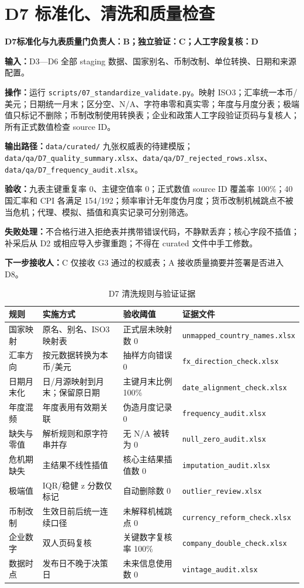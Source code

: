 \documentclass[UTF8,fontset=windows,12pt,openany]{ctexbook}
\newcommand{\File}[1]{{\small\nolinkurl{#1}}}
\newcommand{\StepTitle}[3]{%
  \noindent\colorbox{DeepNavy}{\parbox{0.965\textwidth}{\color{white}\Large\bfseries #1\quad #2\hfill\normalsize #3}}\par\medskip
}
\newcommand{\CardRow}[2]{\noindent\textbf{#1：}#2\par}
\begin{document}
\newpage
\section{D7 标准化、清洗和质量检查}
\StepTitle{D7}{标准化与九表质量门}{负责人：B；独立验证：C；人工字段复核：D}
\CardRow{输入}{D3—D6 全部 staging 数据、国家别名、币制改制、单位转换、日期和来源配置。}
\CardRow{操作}{运行 \File{scripts/07_standardize_validate.py}。映射 ISO3；汇率统一本币/美元；日期统一月末；区分空、N/A、字符串零和真实零；年度与月度分表；极端值只标记不删除；币制改制使用转换表；企业和政策人工字段验证页码与复核人；所有正式数值检查 source ID。}
\CardRow{输出路径}{\File{data/curated/} 九张权威表的待建模版；\File{data/qa/D7_quality_summary.xlsx}、\File{data/qa/D7_rejected_rows.xlsx}、\File{data/qa/D7_frequency_audit.xlsx}。}
\CardRow{验收}{九表主键重复率 0、主键空值率 0；正式数值 source ID 覆盖率 100\%；40 国汇率和 CPI 各满足 154/192；频率审计无年度伪月度；货币改制机械跳点不被当危机；代理、模拟、插值和真实记录可分别筛选。}
\CardRow{失败处理}{不合格行进入拒绝表并携带错误代码，不静默丢弃；核心字段不插值；补采后从 D2 或相应导入步骤重跑；不得在 curated 文件中手工修数。}
\CardRow{下一步接收人}{C 仅接收 G3 通过的权威表；A 接收质量摘要并签署是否进入 D8。}

\begin{longtable}{p{3.3cm}p{3.2cm}p{3.0cm}p{3.8cm}}
\caption{D7 清洗规则与验证证据}\label{tab:clean-rules}\\
\toprule
\textbf{规则} & \textbf{实施方式} & \textbf{验收阈值} & \textbf{证据文件}\\
\midrule
国家映射 & 原名、别名、ISO3 映射表 & 正式层未映射数 0 & \File{unmapped_country_names.xlsx}\\
汇率方向 & 按元数据转换为本币/美元 & 抽样方向错误 0 & \File{fx_direction_check.xlsx}\\
日期月末化 & 日/月源映射到月末；保留原日期 & 主键月末比例 100\% & \File{date_alignment_check.xlsx}\\
年度混频 & 年度表用有效期关联 & 伪造月度记录 0 & \File{frequency_audit.xlsx}\\
缺失与零值 & 解析规则和原字符串并存 & 无 N/A 被转为 0 & \File{null_zero_audit.xlsx}\\
危机期缺失 & 主结果不线性插值 & 核心主结果插值数 0 & \File{imputation_audit.xlsx}\\
极端值 & IQR/稳健 z 分数仅标记 & 自动删除数 0 & \File{outlier_review.xlsx}\\
币制改制 & 生效日前后统一连续口径 & 未解释机械跳点 0 & \File{currency_reform_check.xlsx}\\
企业数字 & 双人页码复核 & 关键数字复核率 100\% & \File{company_double_check.xlsx}\\
数据时点 & 发布日不晚于决策日 & 未来信息使用数 0 & \File{vintage_audit.xlsx}\\
\bottomrule
\end{longtable}
\end{document}

